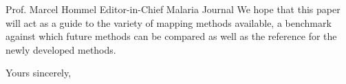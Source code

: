 \documentclass[10pt, a4paper]{letter} %
\begin{document}
\begin{letter}{
Prof. Marcel Hommel
Editor-in-Chief
Malaria Journal
}
We hope that this paper will act as a guide to the variety of mapping methods available, a benchmark against which future methods can be compared as well as the reference for the newly developed methods.


\closing{Yours sincerely,}




\end{letter}
\end{document}
